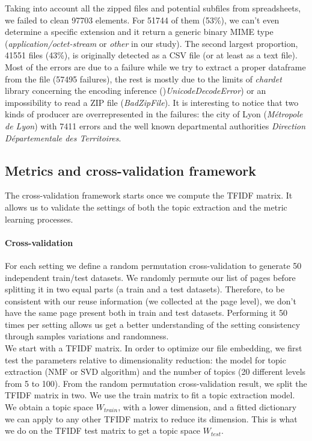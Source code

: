 \documentclass[a4paper]{article}
\begin{document}
	Taking into account all the zipped files and potential subfiles from spreadsheets, we failed to clean 97703 elements. For 51744 of them (53\%), we can't even determine a specific extension and it return a generic binary MIME type (\emph{application/octet-stream} or \emph{other} in our study). The second largest proportion, 41551 files (43\%), is originally detected as a CSV file (or at least as a text file). Most of the errors are due to a failure while we try to extract a proper dataframe from the file (57495 failures), the rest is mostly due to the limits of \emph{chardet} library concerning the encoding inference ()\emph{UnicodeDecodeError}) or an impossibility to read a ZIP file (\emph{BadZipFile}). It is interesting to notice that two kinds of producer are overrepresented in the failures: the city of Lyon (\emph{Métropole de Lyon}) with 7411 errors and the well known departmental authorities \emph{Direction Départementale des Territoires}.
	
	\subsection{Metrics and cross-validation framework}
	
	The cross-validation framework starts once we compute the \ac{TFIDF} matrix. It allows us to validate the settings of both the topic extraction and the metric learning processes.
	
	
	\paragraph{Cross-validation}
	
	For each setting we define a random permutation cross-validation to generate 50 independent train/test datasets. We randomly permute our list of pages before splitting it in two equal parts (a train and a test datasets). Therefore, to be consistent with our reuse information (we collected at the page level), we don't have the same page present both in train and test datasets. Performing it 50 times per setting allows us get a better understanding of the setting consistency through samples variations and randomness.\\
	
	We start with a \ac{TFIDF} matrix. In order to optimize our file embedding, we first test the parameters relative to dimensionality reduction: the model for topic extraction (\ac{NMF} or \ac{SVD} algorithm) and the number of topics (20 different levels from 5 to 100). From the random permutation cross-validation result, we split the \ac{TFIDF} matrix in two. We use the train matrix to fit a topic extraction model. We obtain a topic space $W_{train}$, with a lower dimension, and a fitted dictionary we can apply to any other \ac{TFIDF} matrix to reduce its dimension. This is what we do on the \ac{TFIDF} test matrix to get a topic space $W_{test}$. 
	
\end{document}
